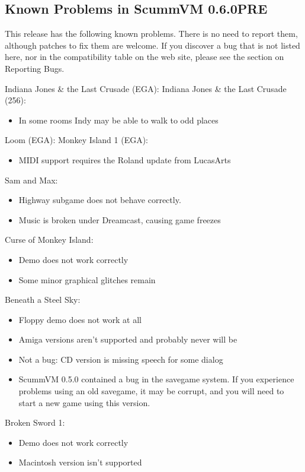 

\subsection{Known Problems in ScummVM 0.6.0PRE}

This release has the following known problems. There is no need to report them,
although patches to fix them are welcome. If you discover a bug that is not
listed here, nor in the compatibility table on the web site, please see
the section on Reporting Bugs.

Indiana Jones \& the Last Crusade (EGA):
Indiana Jones \& the Last Crusade (256):
  \begin{itemize}
  \item In some rooms Indy may be able to walk to odd places
  \end{itemize}
Loom (EGA):
Monkey Island 1 (EGA):
  \begin{itemize}
  \item MIDI support requires the Roland update from LucasArts
  \end{itemize}
Sam and Max:
  \begin{itemize}
  \item Highway subgame does not behave correctly.
  \item Music is broken under Dreamcast, causing game freezes
  \end{itemize}
Curse of Monkey Island:
  \begin{itemize}
  \item Demo does not work correctly
  \item Some minor graphical glitches remain
  \end{itemize}
Beneath a Steel Sky:
  \begin{itemize}
  \item Floppy demo does not work at all
  \item Amiga versions aren't supported and probably never will be
  \item Not a bug: CD version is missing speech for some dialog
  \item ScummVM 0.5.0 contained a bug in the savegame system.
                  If you experience problems using an old savegame, it may be
                  corrupt, and you will need to start a new game using this
                  version.
  \end{itemize}
Broken Sword 1:
  \begin{itemize}
  \item Demo does not work correctly
  \item Macintosh version isn't supported
  \end{itemize}
